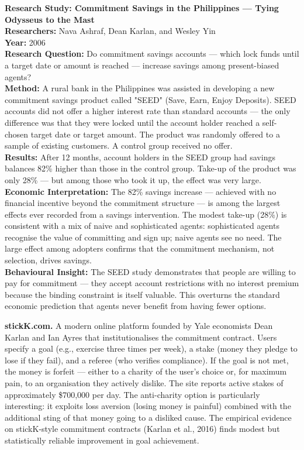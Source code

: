 \documentclass[12pt, letterpaper]{article}
\begin{document}
\begin{researchbox}
\textbf{Research Study: Commitment Savings in the Philippines --- Tying Odysseus to the Mast}\\[4pt]

\textbf{Researchers:} Nava Ashraf, Dean Karlan, and Wesley Yin\\[4pt]
\textbf{Year:} 2006\\[4pt]
\textbf{Research Question:} Do commitment savings accounts --- which lock funds until a target date or amount is reached --- increase savings among present-biased agents?\\[4pt]
\textbf{Method:} A rural bank in the Philippines was assisted in developing a new commitment savings product called "SEED" (Save, Earn, Enjoy Deposits). SEED accounts did not offer a higher interest rate than standard accounts --- the only difference was that they were locked until the account holder reached a self-chosen target date or target amount. The product was randomly offered to a sample of existing customers. A control group received no offer.\\[4pt]
\textbf{Results:} After 12 months, account holders in the SEED group had savings balances 82\% higher than those in the control group. Take-up of the product was only 28\% --- but among those who took it up, the effect was very large.\\[4pt]
\textbf{Economic Interpretation:} The 82\% savings increase --- achieved with no financial incentive beyond the commitment structure --- is among the largest effects ever recorded from a savings intervention. The modest take-up (28\%) is consistent with a mix of naive and sophisticated agents: sophisticated agents recognise the value of committing and sign up; naive agents see no need. The large effect among adopters confirms that the commitment mechanism, not selection, drives savings.\\[4pt]
\textbf{Behavioural Insight:} The SEED study demonstrates that people are willing to pay for commitment --- they accept account restrictions with no interest premium because the binding constraint is itself valuable. This overturns the standard economic prediction that agents never benefit from having fewer options.\\[4pt]
\end{researchbox}

\textbf{stickK.com.} A modern online platform founded by Yale economists Dean Karlan and Ian Ayres that institutionalises the commitment contract. Users specify a goal (e.g., exercise three times per week), a stake (money they pledge to lose if they fail), and a referee (who verifies compliance). If the goal is not met, the money is forfeit --- either to a charity of the user's choice or, for maximum pain, to an organisation they actively dislike. The site reports active stakes of approximately \$700,000 per day. The anti-charity option is particularly interesting: it exploits loss aversion (losing money is painful) combined with the additional sting of that money going to a disliked cause. The empirical evidence on stickK-style commitment contracts (Karlan et al., 2016) finds modest but statistically reliable improvement in goal achievement.
\end{document}
